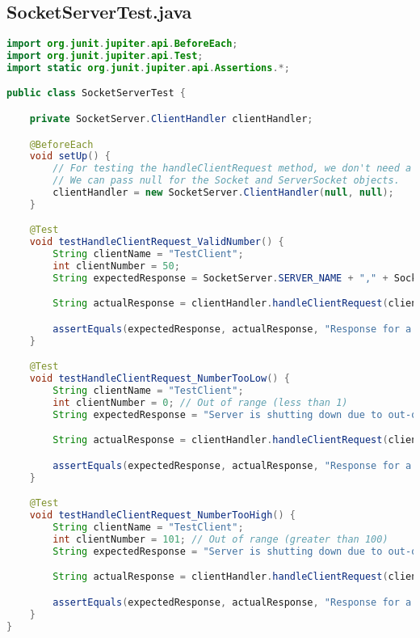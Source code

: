 \documentclass{article}
\begin{document}
\subsection{SocketServerTest.java}
\begin{lstlisting}[language=Java, caption={SocketServerTest.java - JUnit Tests}]
import org.junit.jupiter.api.BeforeEach;
import org.junit.jupiter.api.Test;
import static org.junit.jupiter.api.Assertions.*;

public class SocketServerTest {

    private SocketServer.ClientHandler clientHandler;

    @BeforeEach
    void setUp() {
        // For testing the handleClientRequest method, we don't need a real socket.
        // We can pass null for the Socket and ServerSocket objects.
        clientHandler = new SocketServer.ClientHandler(null, null);
    }

    @Test
    void testHandleClientRequest_ValidNumber() {
        String clientName = "TestClient";
        int clientNumber = 50;
        String expectedResponse = SocketServer.SERVER_NAME + "," + SocketServer.SERVER_NUMBER;

        String actualResponse = clientHandler.handleClientRequest(clientName, clientNumber);

        assertEquals(expectedResponse, actualResponse, "Response for a valid number should contain server name and number.");
    }

    @Test
    void testHandleClientRequest_NumberTooLow() {
        String clientName = "TestClient";
        int clientNumber = 0; // Out of range (less than 1)
        String expectedResponse = "Server is shutting down due to out-of-range input.";

        String actualResponse = clientHandler.handleClientRequest(clientName, clientNumber);

        assertEquals(expectedResponse, actualResponse, "Response for a number less than 1 should be a shutdown message.");
    }

    @Test
    void testHandleClientRequest_NumberTooHigh() {
        String clientName = "TestClient";
        int clientNumber = 101; // Out of range (greater than 100)
        String expectedResponse = "Server is shutting down due to out-of-range input.";

        String actualResponse = clientHandler.handleClientRequest(clientName, clientNumber);

        assertEquals(expectedResponse, actualResponse, "Response for a number greater than 100 should be a shutdown message.");
    }
}
\end{lstlisting}
\end{document}
